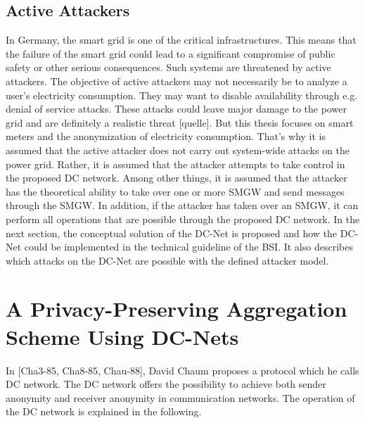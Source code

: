 \subsection{Active Attackers}
In Germany, the smart grid is one of the critical infrastructures. This means that the failure of the smart grid could lead to a significant compromise of public safety or other serious consequences. Such systems are threatened by active attackers. The objective of active attackers may not necessarily be to analyze a user's electricity consumption. They may want to disable availability through e.g. denial of service attacks. These attacks could leave major damage to the power grid and are definitely a realistic threat [quelle]. But this thesis focuses on smart meters and the anonymization of electricity consumption. That's why it is assumed that the active attacker does not carry out system-wide attacks on the power grid. Rather, it is assumed that the attacker attempts to take control in the proposed DC network. Among other things, it is assumed that the attacker has the theoretical ability to take over one or more SMGW and send messages through the SMGW. In addition, if the attacker has taken over an SMGW, it can perform all operations that are possible through the proposed DC network. In the next section, the conceptual solution of the DC-Net is proposed and how the DC-Net could be implemented in the technical guideline of the BSI. It also describes which attacks on the DC-Net are possible with the defined attacker model.
\section{A Privacy-Preserving Aggregation Scheme Using DC-Nets}
In [Cha3-85, Cha8-85, Chau-88], David Chaum proposes a protocol which he calls DC network. The DC network offers the possibility to achieve both sender anonymity and receiver anonymity in communication networks. The operation of the DC network is explained in the following.
